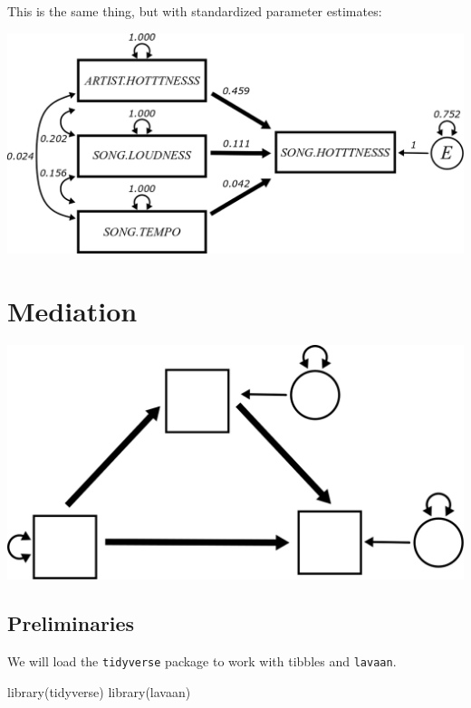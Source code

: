 \documentclass[
]{book}
\newenvironment{Shaded}{\begin{snugshade}}{\end{snugshade}}
\newcommand{\FunctionTok}[1]{\textcolor[rgb]{0.00,0.00,0.00}{#1}}
\newcommand{\NormalTok}[1]{#1}
\begin{document}
This is the same thing, but with standardized parameter estimates:

\begin{center}\includegraphics{graphics/multiple_regression_music_std} \end{center}

\hypertarget{mediation}{%
\chapter{Mediation}\label{mediation}}

\begin{center}\includegraphics{graphics/mediation} \end{center}

\hypertarget{preliminaries-2}{%
\section*{Preliminaries}\label{preliminaries-2}}

We will load the \texttt{tidyverse} package to work with tibbles and \texttt{lavaan}.

\begin{Shaded}
\begin{Highlighting}[]
\FunctionTok{library}\NormalTok{(tidyverse)}
\FunctionTok{library}\NormalTok{(lavaan)}
\end{Highlighting}
\end{Shaded}
\end{document}
